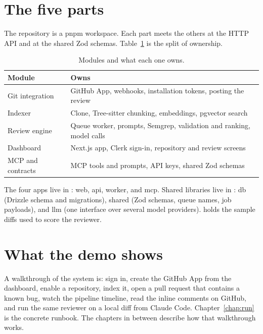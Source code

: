 \section{The five parts}

The repository is a pnpm workspace. Each part meets the others at the HTTP API and at the shared Zod schemas. Table~\ref{tab:modules} is the split of ownership.

\begin{table}[H]
  \centering
  \caption{Modules and what each one owns.}
  \label{tab:modules}
  \begin{tabular}{@{}lp{9.6cm}@{}}
    \toprule
    Module & Owns \\
    \midrule
    Git integration & GitHub App, webhooks, installation tokens, posting the review \\
    Indexer & Clone, Tree-sitter chunking, embeddings, pgvector search \\
    Review engine & Queue worker, prompts, Semgrep, validation and ranking, model calls \\
    Dashboard & Next.js app, Clerk sign-in, repository and review screens \\
    MCP and contracts & MCP tools and prompts, API keys, shared Zod schemas \\
    \bottomrule
  \end{tabular}
\end{table}

The four apps live in : web, api, worker, and mcp. Shared libraries live in : db (Drizzle schema and migrations), shared (Zod schemas, queue names, job payloads), and llm (one interface over several model providers).  holds the sample diffs used to score the reviewer.

\section{What the demo shows}

A walkthrough of the system is: sign in, create the GitHub App from the dashboard, enable a repository, index it, open a pull request that contains a known bug, watch the pipeline timeline, read the inline comments on GitHub, and run the same reviewer on a local diff from Claude Code. Chapter~\ref{chap:run} is the concrete runbook. The chapters in between describe how that walkthrough works.
